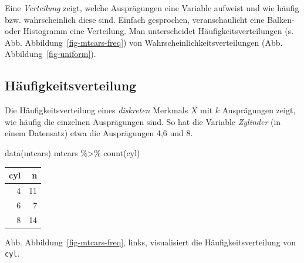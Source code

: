 \documentclass[
  a4paper,
  DIV=11]{scrreprt}
\newenvironment{Shaded}{\begin{snugshade}}{\end{snugshade}}
\newcommand{\FunctionTok}[1]{\textcolor[rgb]{0.28,0.35,0.67}{#1}}
\newcommand{\NormalTok}[1]{\textcolor[rgb]{0.00,0.23,0.31}{#1}}
\newcommand{\SpecialCharTok}[1]{\textcolor[rgb]{0.37,0.37,0.37}{#1}}
\theoremstyle{definition}
\theoremstyle{remark}
\begin{document}
\begin{tcolorbox}[enhanced jigsaw, title=\textcolor{quarto-callout-important-color}{\faExclamation}\hspace{0.5em}{Wichtig}, bottomtitle=1mm, bottomrule=.15mm, titlerule=0mm, colbacktitle=quarto-callout-important-color!10!white, colframe=quarto-callout-important-color-frame, leftrule=.75mm, left=2mm, toprule=.15mm, colback=white, arc=.35mm, breakable, toptitle=1mm, opacityback=0, rightrule=.15mm, coltitle=black, opacitybacktitle=0.6]

Eine \emph{Verteilung} zeigt, welche Ausprägungen eine Variable aufweist
und wie häufig bzw. wahrscheinlich diese sind. Einfach gesprochen,
veranschaulicht eine Balken- oder Histogramm eine Verteilung. Man
unterscheidet Häufigkeitsverteilungen (s. Abb.
Abbildung~\ref{fig-mtcars-freq}) von Wahrscheinlichkeitsverteilungen
(Abb. Abbildung~\ref{fig-uniform}).

\end{tcolorbox}

\hypertarget{huxe4ufigkeitsverteilung}{%
\subsection{Häufigkeitsverteilung}\label{huxe4ufigkeitsverteilung}}

Die Häufigkeitsverteilung eines \emph{diskreten} Merkmals \(X\) mit
\(k\) Ausprägungen zeigt, wie häufig die einzelnen Ausprägungen sind. So
hat die Variable \emph{Zylinder} (in einem Datensatz) etwa die
Ausprägungen 4,6 und 8.

\begin{Shaded}
\begin{Highlighting}[]
\FunctionTok{data}\NormalTok{(mtcars)}
\NormalTok{  mtcars }\SpecialCharTok{\%\textgreater{}\%} 
    \FunctionTok{count}\NormalTok{(cyl)}
\end{Highlighting}
\end{Shaded}

\begin{longtable}[]{@{}rr@{}}
\toprule()
cyl & n \\
\midrule()
\endhead
4 & 11 \\
6 & 7 \\
8 & 14 \\
\bottomrule()
\end{longtable}

Abb. Abbildung~\ref{fig-mtcars-freq}, links, visualisiert die
Häufigkeitsverteilung von \texttt{cyl}.
\end{document}
